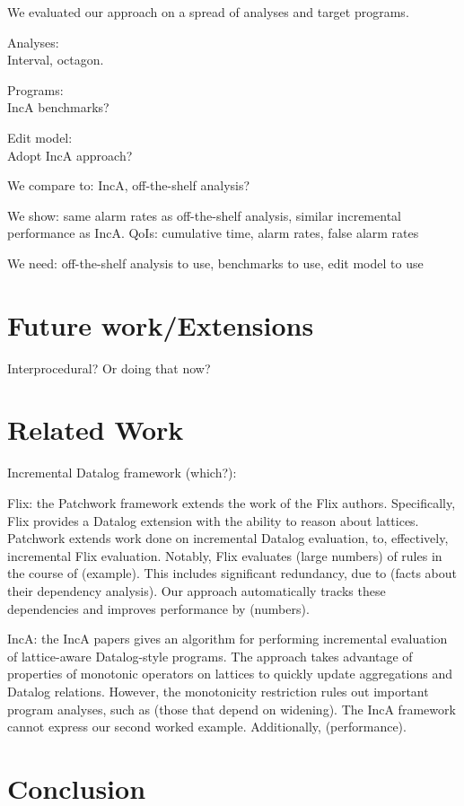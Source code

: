 \documentclass[acmlarge,anonymous]{acmart}\settopmatter{printfolios=true}
\begin{document}
We evaluated our approach on a spread of analyses and target programs.

Analyses:\\
Interval, octagon.

Programs:\\
IncA benchmarks?

Edit model:\\
Adopt IncA approach?

We compare to: IncA, off-the-shelf analysis?

We show: same alarm rates as off-the-shelf analysis, similar incremental performance as IncA. QoIs: cumulative time, alarm rates, false alarm rates

We need: off-the-shelf analysis to use, benchmarks to use, edit model to use

\section{Future work/Extensions}

Interprocedural? Or doing that now?

\section{Related Work}

Incremental Datalog framework (which?):

Flix: the Patchwork framework extends the work of the Flix authors. Specifically, Flix provides a Datalog extension with the ability to reason about lattices. Patchwork extends work done on incremental Datalog evaluation, to, effectively, incremental Flix evaluation. Notably, Flix evaluates (large numbers) of rules in the course of (example). This includes significant redundancy, due to (facts about their dependency analysis). Our approach automatically tracks these dependencies and improves performance by (numbers).

IncA: the IncA papers gives an algorithm for performing incremental evaluation of lattice-aware Datalog-style programs. The approach takes advantage of properties of monotonic operators on lattices to quickly update aggregations and Datalog relations. However, the monotonicity restriction rules out important program analyses, such as (those that depend on widening). The IncA framework cannot express our second worked example. Additionally, (performance).

\section{Conclusion}
\end{document}
